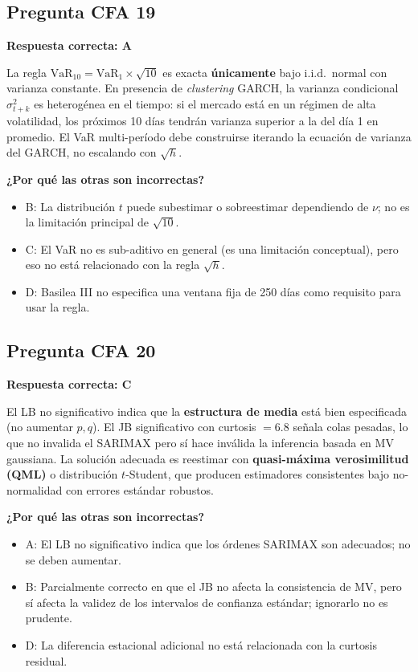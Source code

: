 \documentclass[12pt,a4paper]{article}
\begin{document}
\subsection*{Pregunta CFA 19}

\begin{respuestacfa}
\textbf{Respuesta correcta: A}

La regla $\text{VaR}_{10}=\text{VaR}_1\times\sqrt{10}$ es exacta \textbf{únicamente} bajo i.i.d.\ normal con varianza constante. En presencia de \emph{clustering} GARCH, la varianza condicional $\sigma_{t+k}^2$ es heterogénea en el tiempo: si el mercado está en un régimen de alta volatilidad, los próximos 10 días tendrán varianza superior a la del día 1 en promedio. El VaR multi-período debe construirse iterando la ecuación de varianza del GARCH, no escalando con $\sqrt{h}$.

\textbf{¿Por qué las otras son incorrectas?}
\begin{itemize}[noitemsep]
  \item B: La distribución $t$ puede subestimar o sobreestimar dependiendo de $\nu$; no es la limitación principal de $\sqrt{10}$.
  \item C: El VaR no es sub-aditivo en general (es una limitación conceptual), pero eso no está relacionado con la regla $\sqrt{h}$.
  \item D: Basilea III no especifica una ventana fija de 250 días como requisito para usar la regla.
\end{itemize}
\end{respuestacfa}

\subsection*{Pregunta CFA 20}

\begin{respuestacfa}
\textbf{Respuesta correcta: C}

El LB no significativo indica que la \textbf{estructura de media} está bien especificada (no aumentar $p,q$). El JB significativo con curtosis $=6.8$ señala colas pesadas, lo que no invalida el SARIMAX pero sí hace inválida la inferencia basada en MV gaussiana. La solución adecuada es reestimar con \textbf{quasi-máxima verosimilitud (QML)} o distribución $t$-Student, que producen estimadores consistentes bajo no-normalidad con errores estándar robustos.

\textbf{¿Por qué las otras son incorrectas?}
\begin{itemize}[noitemsep]
  \item A: El LB no significativo indica que los órdenes SARIMAX son adecuados; no se deben aumentar.
  \item B: Parcialmente correcto en que el JB no afecta la consistencia de MV, pero sí afecta la validez de los intervalos de confianza estándar; ignorarlo no es prudente.
  \item D: La diferencia estacional adicional no está relacionada con la curtosis residual.
\end{itemize}
\end{respuestacfa}
\end{document}
